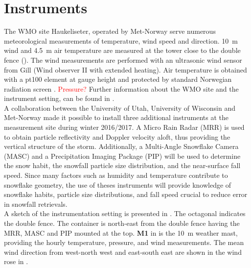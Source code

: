 \section{Instruments} \label{sec:DIM}
The WMO site Haukeliseter, operated by Met-Norway serve numerous meteorological measurements of temperature, wind speed and direction. \SI{10}{\meter} wind and \SI{4.5}{\metre} air temperature are measured at the tower close to the double fence (). The wind measurements are performed with an ultrasonic wind sensor from Gill (Wind observer II with extended heating). Air temperature is obtained with a pt100 element at gauge height and protected by standard Norwegian radiation screen \citep{wolff_derivation_2015}. \textcolor{red}{Pressure? } Further information about the WMO site and the instrument setting, can be found in \citet{wolff_measurements_2013,wolff_derivation_2015}.
\\
A collaboration between the University of Utah, University of Wisconsin and Met-Norway made it possible to install three additional instruments at the measurement site during winter 2016/2017. A Micro Rain Radar (MRR) is used to obtain particle reflectivity and Doppler velocity aloft, thus providing the vertical structure of the storm. 
Additionally, a Multi-Angle Snowflake Camera (MASC) and a Precipitation Imaging Package (PIP) will be used to determine the snow habit, the snowfall particle size distribution, and the near-surface fall speed.  
Since many factors such as humidity and temperature contribute to snowflake geometry, the use of theses instruments will provide knowledge of snowflake habits, particle size distributions, and fall speed crucial to reduce error in snowfall retrievals.
\\

\noindent
A sketch of the instrumentation setting is presented in . The octagonal indicates the double fence. The container is north-east from the double fence having the MRR, MASC and PIP mounted at the top. \textbf{M1} in  is the \SI{10}{\metre} weather mast, providing the hourly \citet{eklima_norwegian_2016} temperature, pressure, and wind measurements. The mean wind direction from west-north west and east-south east are shown in the wind rose in .
%
%
